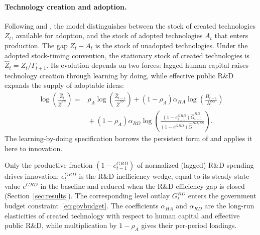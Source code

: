 \documentclass[a4paper,11pt]{article}
\begin{document}
\paragraph{Technology creation and adoption.}
Following \citet{CominGertler2006} and \citet{Anzoateguietal2019}, the model distinguishes between the stock of created technologies $Z_t$, available for adoption, and the stock of adopted technologies $A_t$ that enters production.
The gap $Z_t - A_t$ is the stock of unadopted technologies.
Under the adopted stock-timing convention, the stationary stock of created technologies is $\hat{Z}_t=Z_t/\Gamma_{t+1}$.
Its evolution depends on two forces: lagged human capital raises technology creation through learning by doing, while effective public R\&D expands the supply of adoptable ideas:
\begin{equation} \label{eq:Z}
\begin{aligned}
    \log\!\left(\frac{\hat{Z}_t}{\hat{Z}^{SS}}\right) ={}& \rho_A \log\!\left(\frac{\hat{Z}_{t-1}}{\hat{Z}^{SS}}\right)
    + \left(1-\rho_A\right)\alpha_{HA} \log\!\left(\frac{H_{t-1}}{H^{SS}}\right) \\
    &{}+ \left(1-\rho_A\right)\alpha_{RD} \log\!\left(\frac{\left(1-e_{t-1}^{GRD}\right) \hat{G}_{t-1}^{RD}}{\left(1-e^{GRD}\right) \hat{G}^{RD,SS}}\right).
\end{aligned}
\end{equation}
The learning-by-doing specification borrows the persistent form of \citet{ChangGomesSchorfheide2002} and applies it here to innovation.

Only the productive fraction $\left(1-e_{t-1}^{GRD}\right)$ of normalized (lagged) R\&D spending drives innovation: $e_t^{GRD}$ is the R\&D inefficiency wedge, equal to its steady-state value $e^{GRD}$ in the baseline and reduced when the R\&D efficiency gap is closed (Section~\ref{sec:results}).
The corresponding level outlay $G_t^{RD}$ enters the government budget constraint~\eqref{eq:govbudget}.
The coefficients $\alpha_{HA}$ and $\alpha_{RD}$ are the long-run elasticities of created technology with respect to human capital and effective public R\&D, while multiplication by $1-\rho_A$ gives their per-period loadings.
\end{document}
